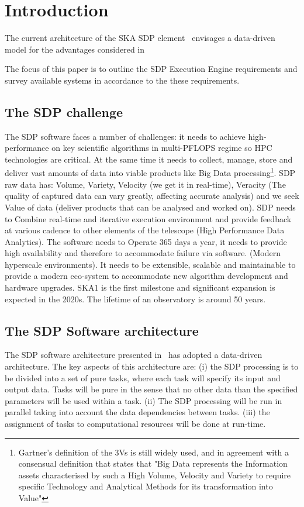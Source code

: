 \section{Introduction}

The current architecture of the SKA SDP element~\cite{SDParch} envisages a 
data-driven model for the advantages considered in~\cite{DDchoice}

The focus of this paper is to outline the SDP Execution Engine requirements
and survey available systems in accordance to the these 
requirements.

\subsection{The SDP challenge}
The SDP software faces a number of challenges: it needs to achieve high-performance on key scientific algorithms in multi-PFLOPS regime so HPC technologies are critical. At the same time it needs to collect, manage, store and deliver vast amounts of data into viable products like Big Data processing\footnote{Gartner's definition of the 3Vs is still widely used, and in agreement with a consensual definition that states that "Big Data represents the Information assets characterised by such a High Volume, Velocity and Variety to require specific Technology and Analytical Methods for its transformation into Value"}. SDP raw data has: Volume, Variety, Velocity (we get it in real-time), Veracity (The quality of captured data can vary greatly, affecting accurate analysis) and we seek Value of data (deliver products that can be analysed and worked on). 
SDP needs to Combine real-time and iterative execution environment and provide feedback at various cadence to other elements of the telescope (High Performance Data Analytics). The software needs to Operate 365 days a year, it needs to provide high availability and therefore to accommodate failure via software. (Modern hyperscale environments).
It needs to be extensible, scalable and maintainable to provide a modern eco-system to accommodate new algorithm development and hardware upgrades.
SKA1 is the first milestone and significant expansion is expected in the 2020s. The lifetime of an observatory is around 50 years. 

\subsection{The SDP Software architecture}
The SDP software architecture presented in~\cite{SDParch} has adopted a data-driven architecture. The key aspects of this architecture 
are: (i) the SDP processing is to be divided into a set of pure tasks, where each task will specify its input and output data. 
Tasks will be pure in the sense that no other data than the specified parameters will be used within a task. (ii) The SDP processing 
will be run in parallel taking into account the data dependencies between tasks. (iii) the assignment of tasks to computational resources will be done
at run-time. 


